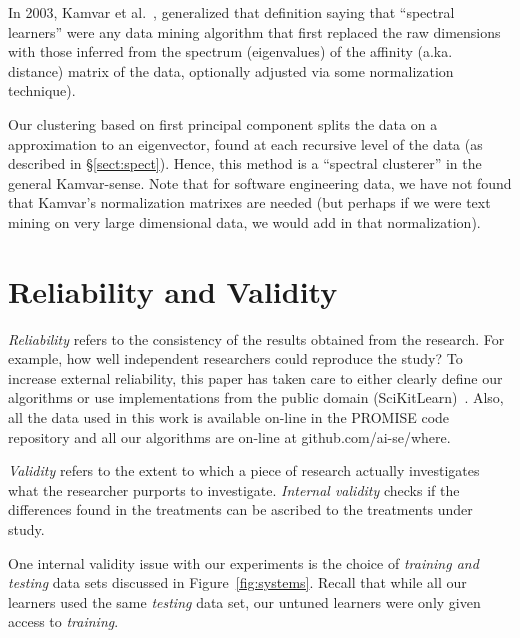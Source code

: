 \documentclass{sig-alternative}
\newcommand{\tion}[1]{\S\ref{sect:#1}}
\newcommand{\fig}[1]{Figure~\ref{fig:#1}}
\begin{document}
In 2003, Kamvar et al.~\cite{kamvar2003spectral},  generalized that definition saying that ``spectral learners''
were any data mining algorithm that first replaced the raw
dimensions with those inferred from the spectrum (eigenvalues) of the affinity (a.ka. distance)
matrix of the data, optionally adjusted via some normalization technique).

Our clustering based on first principal component splits the data on a   approximation to an eigenvector, found at each recursive level
of the data (as described in \tion{spect}). 
Hence, this  method is a ``spectral clusterer'' in the general Kamvar-sense. 
Note that
for software engineering data, we have
not found that Kamvar's normalization matrixes are needed (but perhaps if we were text mining
on very large dimensional data, we would add in that normalization). 
 


\section{Reliability and Validity}\label{sect:construct}

{\em Reliability} refers to the consistency of the results obtained
from the research.  For example,   how well independent researchers
could reproduce the study? To increase external
reliability, this paper has taken care to either  clearly define our
algorithms or use implementations from the public domain
(SciKitLearn)~\cite{scikit-learn}. Also, all the data used in this work is available
on-line in the PROMISE code repository and all our algorithms
are on-line at github.com/ai-se/where.

{\em Validity} refers to the extent to which a piece of research actually
investigates what the researcher purports to investigate.
{\em Internal validity} checks if the differences found in
the treatments can be ascribed to the treatments under study. 

One internal validity issue with our experiments is the choice
of {\em training and testing} data sets discussed in 
\fig{systems}. Recall that while all our learners used the same
{\em testing} data set, our untuned learners were only given
access to {\em training}.
\end{document}
